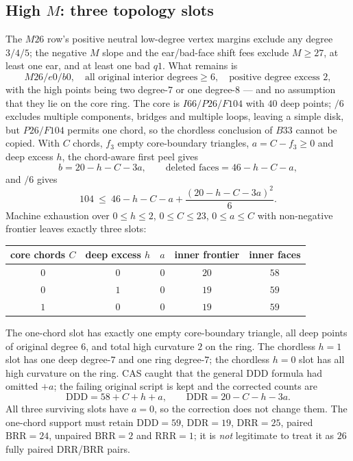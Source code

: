 \subsection{High $M$: three topology slots}

The $M26$ row's positive neutral low-degree vertex margins exclude any degree $3/4/5$; the negative
$M$ slope and the ear/bad-face shift fees exclude $M\ge27$, at least one ear, and at least one bad
$q1$. What remains is
\[
M26/e0/b0,\quad\text{all original interior degrees}\ge6,\quad\text{positive degree excess }2,
\]
with the high points being two degree-$7$ or one degree-$8$ --- and no assumption that they lie on
the core ring. The core is $I66/P26/F104$ with $40$ deep points; $/6$ excludes multiple components,
bridges and multiple loops, leaving a simple disk, but $P26/F104$ permits one chord, so the
chordless conclusion of $B33$ cannot be copied. With $C$ chords, $f_3$ empty core-boundary
triangles, $a=C-f_3\ge0$ and deep excess $h$, the chord-aware first peel gives
\[
b=20-h-C-3a,\qquad \text{deleted faces}=46-h-C-a,
\]
and $/6$ gives
\[
104\ \le\ 46-h-C-a+\frac{(20-h-C-3a)^2}{6}.
\]
Machine exhaustion over $0\le h\le2$, $0\le C\le23$, $0\le a\le C$ with non-negative frontier leaves
exactly three slots:

\begin{center}
\footnotesize
\begin{tabular}{@{}ccccc@{}}
\toprule
core chords $C$ & deep excess $h$ & $a$ & inner frontier & inner faces \\
\midrule
$0$ & $0$ & $0$ & $20$ & $58$ \\
$0$ & $1$ & $0$ & $19$ & $59$ \\
$1$ & $0$ & $0$ & $19$ & $59$ \\
\bottomrule
\end{tabular}
\end{center}

The one-chord slot has exactly one empty core-boundary triangle, all deep points of original degree
$6$, and total high curvature $2$ on the ring. The chordless $h=1$ slot has one deep degree-$7$ and
one ring degree-$7$; the chordless $h=0$ slot has all high curvature on the ring. CAS caught that the
general DDD formula had omitted $+a$; the failing original script is kept and the corrected counts
are
\[
\mathrm{DDD}=58+C+h+a,\qquad \mathrm{DDR}=20-C-h-3a .
\]
All three surviving slots have $a=0$, so the correction does not change them. The one-chord support
must retain $\mathrm{DDD}=59$, $\mathrm{DDR}=19$, $\mathrm{DRR}=25$, paired $\mathrm{BRR}=24$,
unpaired $\mathrm{BRR}=2$ and $\mathrm{RRR}=1$; it is \emph{not} legitimate to treat it as $26$ fully
paired DRR/BRR pairs.

